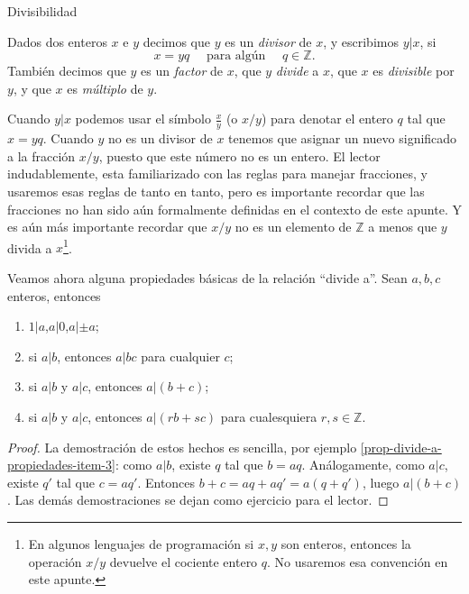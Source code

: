 \begin{section}{Divisibilidad}\label{1.6}


\begin{definicion}Dados dos enteros $x$ e $y$ decimos que $y$ es un \textit{divisor} de $x$, y escribimos $y|x$, si
$$
x=yq\quad\text{ para algún }\quad q\in \mathbb Z.
$$
También decimos que $y$ es un \textit{factor} de $x$, que $y$ \textit{divide} a $x$, que $x$ es \textit{divisible} por $y$, y que $x$ es \textit{múltiplo} de $y$.
\end{definicion}

Cuando $y|x$ podemos usar el símbolo $\frac{x}{y}$ (o $x/y$) para denotar el entero $q$ tal que $ x=yq$. Cuando $y$ no es un divisor de $x$ tenemos que asignar un nuevo significado a la fracción $x/y$, puesto que este número no es un entero. El lector indudablemente, esta familiarizado con las reglas para manejar
fracciones, y usaremos esas reglas de tanto en tanto, pero es importante recordar que las fracciones no han sido aún formalmente definidas en el contexto de este apunte. Y es aún más importante recordar que $x/y$ no es un elemento de $\mathbb Z$ a menos que $y$ divida a $x$\footnote{En algunos lenguajes de programación si $x,y$ son enteros, entonces la operación $x/y$ devuelve el cociente entero $q$. No usaremos esa convención en este apunte.}.


\begin{observacion}\label{prop-divide-a-propiedades} Veamos ahora alguna propiedades básicas de la relación ``divide a''. Sean $a,b,c$ enteros, entonces
\begin{enumerate}[label=\textit{\alph*)}]
\item\label{prop-divide-a-propiedades-item-1} $1|a$,\qquad $a|0$,\qquad $a|\pm a$;
\item\label{prop-divide-a-propiedades-item-2} si $a|b$, entonces $a|bc$ para cualquier $c$;
\item\label{prop-divide-a-propiedades-item-3} si $a|b$ y $a|c$, entonces $a|(b+c)$;
\item\label{prop-divide-a-propiedades-item-4} si $a|b$ y $a|c$, entonces $a|(rb+sc)$ para cualesquiera $r,s \in \mathbb Z$.
\end{enumerate}
\begin{proof}
La demostración de estos hechos es sencilla, por ejemplo \ref{prop-divide-a-propiedades-item-3}: como $a|b$, existe $q$ tal que $b = aq$. Análogamente, como $a|c$, existe $q'$ tal que $c = aq'$. Entonces $b+c = aq+aq' = a(q+q')$, luego $a|(b+c)$.  
Las demás demostraciones se dejan como ejercicio para el lector. 
\end{proof}
\end{observacion}



\end{section}
